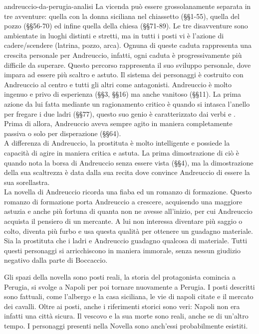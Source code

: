 \documentclass[preview]{standalone}
\begin{document}
\begin{snippet}{andreuccio-da-perugia-analisi}
    La vicenda può essere grossolanamente separata in tre avventure:
    quella con la donna siciliana nel chiassetto (§§1-55), quella del pozzo (§§56-70)
    ed infine quella della chiesa (§§71-89).
    Le tre disavventure sono ambientate in luoghi distinti e stretti,
    ma in tutti i posti vi è l'azione di cadere/scendere (latrina, pozzo, arca).
    Ognuna di queste caduta rappresenta una crescita personale per Andreuccio, infatti,
    ogni caduta è progressivamente più difficile da superare. Questo percorso rappresenta il suo
    sviluppo personale, dove impara ad essere più scaltro e astuto.
    Il sistema dei personaggi è costruito con Andreuccio al centro e tutti gli altri come antagonisti.
    Andreuccio è molto ingenuo e privo di esperienza (§§3, §§16) ma anche vanitoso (§§11).
    La prima azione da lui fatta mediante un ragionamento critico è quando si intasca l'anello per fregare i due ladri (§§77),
    questo suo genio è caratterizzato dai verbi  e .
    Prima di allora, Andreuccio aveva sempre agito in maniera completamente passiva o solo per disperazione (§§64).
    \\
    A differenza di Andreuccio, la prostituta è molto intelligente e possiede la capacità di agire in maniera critica e astuta.
    La prima dimostrazione di ciò è quando nota la borsa di Andreuccio senza essere vista (§§4),
    ma la dimostrazione della sua scaltrezza è data dalla sua recita dove convince Andreuccio di essere la sua sorellastra.
    \\
    La novella di Andreuccio ricorda una fiaba ed un romanzo di formazione.
    Questo romanzo di formazione porta Andreuccio a crescere, acquisendo una maggiore astuzia e anche più fortuna di
    quanta non ne avesse all'inizio, per cui Andreuccio acquista il pensiero di un mercante.
    A lui non interessa diventare più saggio o colto, diventa più furbo e usa questa qualità per ottenere un guadagno materiale.
    Sia la prostituta che i ladri e Andreuccio guadagno qualcosa di materiale.
    Tutti questi personaggi si arricchiscono in maniera immorale, senza nessun giudizio negativo dalla parte di Boccaccio.
    
    Gli spazi della novella sono posti reali, la storia del protagonista comincia a Perugia,
    si svolge a Napoli per poi tornare nuovamente a Perugia.
    I posti descritti sono fattuali, come l'albergo e la casa siciliana, le vie di napoli citate
    e il mercato dei cavalli.
    Oltre ai posti, anche i riferimenti storici sono veri: Napoli non era infatti una città sicura.
    Il vescovo e la sua morte sono reali, anche se di un'altro tempo. I personaggi presenti nella Novella
    sono anch'essi probabilmente esistiti.
\end{snippet}
\end{document}
